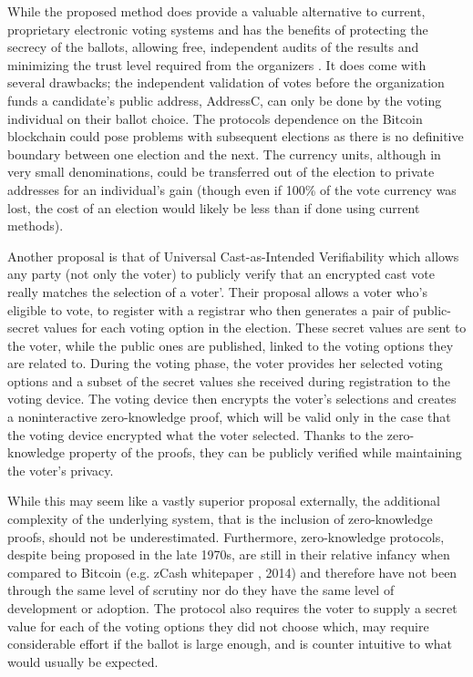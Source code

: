 \documentclass{article}
\begin{document}
While the proposed method does provide a valuable alternative to current, proprietary electronic voting systems and has the benefits of protecting the secrecy of the ballots, allowing free, independent audits of the results and minimizing the trust level required from the organizers \citep{3_noizat_2016}. It does come with several drawbacks; the independent validation of votes before the organization funds a candidate's public address, AddressC, can only be done by the voting individual on their ballot choice. The protocols dependence on the Bitcoin blockchain could pose problems with subsequent elections as there is no definitive boundary between one election and the next. The currency units, although in very small denominations, could be transferred out of the election to private addresses for an individual's gain (though even if 100\% of the vote currency was lost, the cost of an election would likely be less than if done using current methods).

Another proposal is that of Universal Cast-as-Intended Verifiability \citep{49_escala_guasch_herranz_morillo_2015} which allows any party (not only the voter) to publicly verify that an encrypted cast vote really matches the selection of a voter’. Their proposal allows a voter who’s eligible to vote, to register with a registrar who then generates a pair of public-secret values for each voting option in the election. These secret values are sent to the voter, while the public ones are published, linked to the voting options they are related to. During the voting phase, the voter provides her selected voting options and a subset of the secret values she received during registration to the voting device. The voting device then encrypts the voter’s selections and creates a noninteractive zero-knowledge proof, which will be valid only in the case that the voting device encrypted what the voter selected. Thanks to the zero-knowledge property of the proofs, they can be publicly verified while maintaining the voter’s privacy.

While this may seem like a vastly superior proposal externally, the additional complexity of the underlying system, that is the inclusion of zero-knowledge proofs, should not be underestimated. Furthermore, zero-knowledge protocols, despite being proposed in the late 1970s, are still in their relative infancy when compared to Bitcoin (e.g. zCash whitepaper \citep{50_ben-sasson_chiesa_garman_green_miers_tromer_virza_2014}, 2014) and therefore have not been through the same level of scrutiny nor do they have the same level of development or adoption. The protocol also requires the voter to supply a secret value for each of the voting options they did not choose which, may require considerable effort if the ballot is large enough, and is counter intuitive to what would usually be expected.

\end{document}
